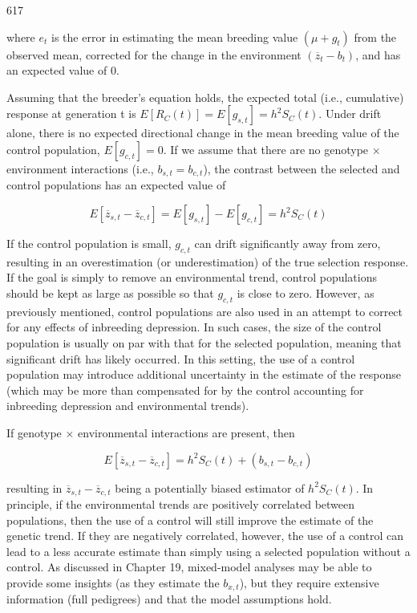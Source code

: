 \documentclass{article}
\begin{document}
617

where  $ e_t $ is the error in estimating the mean breeding value  $ (\mu + g_t) $ from the observed mean, corrected for the change in the environment  $ (\overline{z}_t - b_t) $, and has an expected value of 0.

Assuming that the breeder's equation holds, the expected total (i.e., cumulative) response at generation t is  $ E[R_C(t)] = E[g_{s,t}] = h^2 S_C(t) $. Under drift alone, there is no expected directional change in the mean breeding value of the control population,  $ E[g_{c,t}] = 0 $. If we assume that there are no genotype × environment interactions (i.e.,  $ b_{s,t} = b_{c,t} $), the contrast between the selected and control populations has an expected value of

\begin{equation}
E[\overline{z}_{s,t}-\overline{z}_{c,t}]=E[g_{s,t}]-E[g_{c,t}]=h^{2}S_{C}(t)
\tag{18.24a}
\label{eq:18_24a}
\end{equation}

If the control population is small,  $ g_{c,t} $ can drift significantly away from zero, resulting in an overestimation (or underestimation) of the true selection response. If the goal is simply to remove an environmental trend, control populations should be kept as large as possible so that  $ g_{c,t} $ is close to zero. However, as previously mentioned, control populations are also used in an attempt to correct for any effects of inbreeding depression. In such cases, the size of the control population is usually on par with that for the selected population, meaning that significant drift has likely occurred. In this setting, the use of a control population may introduce additional uncertainty in the estimate of the response (which may be more than compensated for by the control accounting for inbreeding depression and environmental trends).

If genotype  $ \times $ environmental interactions are present, then

\begin{equation}
E[\overline{z}_{s,t}-\overline{z}_{c,t}]=h^{2}S_{C}(t)+(b_{s,t}-b_{c,t})
\tag{18.24b}
\label{eq:18_24b}
\end{equation}

resulting in  $ \overline{z}_{s,t} - \overline{z}_{c,t} $ being a potentially biased estimator of  $ h^{2}S_{C}(t) $. In principle, if the environmental trends are positively correlated between populations, then the use of a control will still improve the estimate of the genetic trend. If they are negatively correlated, however, the use of a control can lead to a less accurate estimate than simply using a selected population without a control. As discussed in Chapter 19, mixed-model analyses may be able to provide some insights (as they estimate the  $ b_{x,t} $), but they require extensive information (full pedigrees) and that the model assumptions hold.
\end{document}
